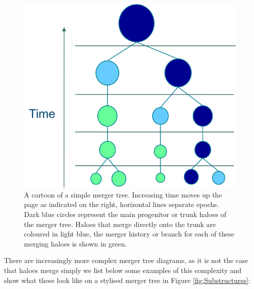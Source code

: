 \begin{figure}[h]
    \centering
    \includegraphics[width = \linewidth]{Figures/Chapter1/Merger_Tree_Simple.png}
    \caption{A cartoon of a simple merger tree. Increasing time moves up the page as indicated on the right, horizontal lines separate epochs. Dark blue circles represent the main progenitor or trunk haloes of the merger tree. Haloes that merge directly onto the trunk are coloured in light blue, the merger history or branch for each of these merging haloes is shown in green.}
    \label{fig:SimpleTree}
\end{figure}

There are increasingly more complex merger tree diagrams, as it is not the case that haloes merge simply we list below some examples of this complexity and show what these look like on a stylised merger tree in Figure \ref{fig:Substructures}:

